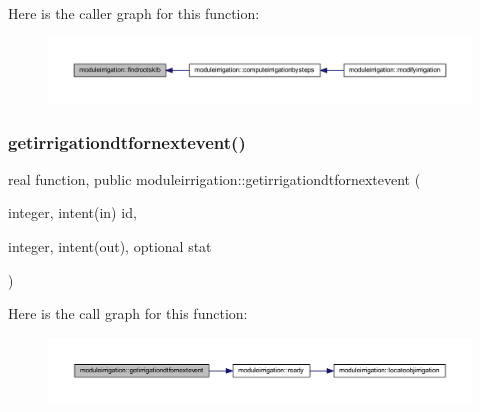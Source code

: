 Here is the caller graph for this function\+:\nopagebreak
\begin{figure}[H]
\begin{center}
\leavevmode
\includegraphics[width=350pt]{namespacemoduleirrigation_a3bf1e9298115d3f00376f1288687113b_icgraph}
\end{center}
\end{figure}
\mbox{\label{namespacemoduleirrigation_aa24ee945c35012ad9d3790d40cbd02ab}} 
\subsubsection{\texorpdfstring{getirrigationdtfornextevent()}{getirrigationdtfornextevent()}}
{\footnotesize\ttfamily real function, public moduleirrigation\+::getirrigationdtfornextevent (\begin{DoxyParamCaption}\item[{integer, intent(in)}]{id,  }\item[{integer, intent(out), optional}]{stat }\end{DoxyParamCaption})}

Here is the call graph for this function\+:\nopagebreak
\begin{figure}[H]
\begin{center}
\leavevmode
\includegraphics[width=350pt]{namespacemoduleirrigation_aa24ee945c35012ad9d3790d40cbd02ab_cgraph}
\end{center}
\end{figure}
\mbox{\label{namespacemoduleirrigation_affdb4d2e7e0c67d2c459ff6596babad9}} 
